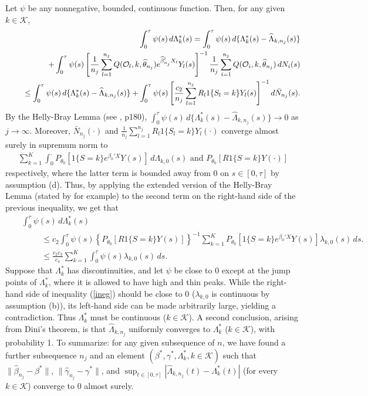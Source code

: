 \documentclass{statsoc}
\begin{document}
Let $\psi$ be any nonnegative, bounded, continuous function. Then, for any given $k\in\mathcal K$,
\begin{eqnarray*}
&&\int^\tau_0\psi(s)\,d\Lambda^\ast_k(s)=\int^\tau_0\psi(s)\,d\{\Lambda^\ast_k(s)-\widehat\Lambda_{k,n_j}(s)\}\\
&&\hspace{.5cm}+\int^\tau_0\psi(s)\left[\frac{1}{n_j}\sum_{l=1}^{n_j}Q(\mathcal O_l,k,\widehat\theta_{n_j})e^{\widehat\beta_{n_j}'X_l}Y_l(s)\right]^{-1}\frac{1}{n_j}\sum_{i=1}^{n_j}Q(\mathcal O_i,k,\widehat\theta_{n_j})\,dN_i(s) \\
&&\hspace{.5cm}\leq\int^\tau_0\psi(s)\,d\{\Lambda^\ast_k(s)-\widehat\Lambda_{k,n_j}(s)\}+\int^\tau_0\psi(s)\left[\frac{c_2}{n_j}\sum_{l=1}^{n_j}R_l1\{S_l=k\}Y_l(s)\right]^{-1}d\bar N_{n_j}(s).
\end{eqnarray*}
 By the Helly-Bray Lemma (see \cite{loeve}, p180), $\int^\tau_0\psi(s)\,d\{\Lambda^\ast_k(s)-\widehat\Lambda_{k,n_j}(s)\}\rightarrow 0$ as $j\rightarrow \infty$. Moreover, $\bar N_{n_j}(\cdot)$ and $\frac{1}{n_j}\sum_{l=1}^{n_j}R_l1\{S_l=k\}Y_l(\cdot)$ converge almost surely in supremum norm to
\begin{eqnarray*}
\sum_{k=1}^K\int_0^\cdot P_{\theta_0}\left[1\{S=k\}e^{\beta_0'X}Y(s)\right]\,d\Lambda_{k,0}(s)\mbox{ and } P_{\theta_0}\left[R1\{S=k\}Y(\cdot)\right]
\end{eqnarray*}
respectively, where the latter term is bounded away from 0 on $s\in[0,\tau]$ by assumption (d). Thus, by applying the extended version of the Helly-Bray Lemma (stated by \cite{kor} for example) to the second term on the right-hand side of the previous inequality, we get that
\begin{eqnarray}\label{ineg}
&&\int^\tau_0\psi(s)\,d\Lambda^\ast_k(s)\\
&&\hspace{1cm}\leq c_2\int^\tau_0\psi(s)\left\{P_{\theta_0}\left[R1\{S=k\}Y(s)\right]\right\}^{-1}\sum_{k=1}^KP_{\theta_0}[1\{S=k\}e^{\beta_0'X}Y(s)]\lambda_{k,0}(s)\,ds.\nonumber\\
&&\hspace{1cm}\leq \frac{c_2c_3}{c_4} \sum_{k=1}^K \int^\tau_0\psi(s) \lambda_{k,0}(s)\,ds.\nonumber
\end{eqnarray}
Suppose that $\Lambda^\ast_k$ has discontinuities, and let $\psi$ be close to 0 except at the jump points of $\Lambda^\ast_k$, where it is allowed to have high and thin peaks. While the right-hand side of inequality (\ref{ineg}) should be close to 0 ($\lambda_{k,0}$ is continuous by assumption (b)), its left-hand side can be made arbitrarily large, yielding a contradiction. Thus $\Lambda^\ast_k$ must be continuous ($k\in\mathcal K$). A second conclusion, arising from Dini's theorem, is that $\widehat\Lambda_{k,n_j}$ uniformly converges to $\Lambda^\ast_k$ ($k\in\mathcal K$), with probability 1. To summarize: for any given subsequence of $n$, we have found a further subsequence $n_j$ and an element $(\beta^\ast,\gamma^\ast, \Lambda^\ast_k, k\in\mathcal K)$ such that $\|\widehat\beta_{n_j}-\beta^\ast\|$, $\|\widehat\gamma_{n_j}-\gamma^\ast\|$, and $\sup_{t\in[0,\tau]}|\widehat\Lambda_{k,n_j}(t)-\Lambda^\ast_k(t)|$ (for every $k\in\mathcal K$) converge to 0 almost surely.
\end{document}
